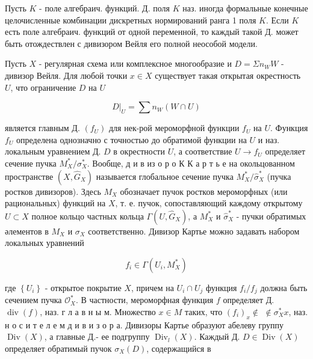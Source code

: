 \documentclass[10pt]{article}
\begin{document}
Пусть $K$ - поле алгебраич. функций. Д. поля $K$ наз. иногда формальные конечные целочисленные комбинации дискретных нормирований ранга 1 поля $K$. Если $K$ есть поле алгебраич. функций от одной переменной, то каждый такой Д. может быть отождествлен с дивизором Вейля его полной неособой модели.



Пусть $X$ - регулярная схема или комплексное многообразие и $D=\Sigma n_{W} W$ - дивизор Вейля. Для любой точки $x \in X$ существует такая открытая окрестность $U$, что ограничение $D$ на $U$



\[

\left.D\right|_{U}=\sum n_{W}(W \cap U)

\]



является главным Д. $\left(f_{U}\right)$ для нек-рой мероморфной функции $f_{U}$ на $U$. Функция $f_{U}$ определена однозначно с точностью до обратимой функции на $U$ и наз. локальным уравнением Д. $D$ в окрестности $U$, а соответствие $U \rightarrow f_{U}$ определяет сечение пучка $M_{X}^{*} / \sigma_{X}^{*}$. Вообще, д и в из о р о К К а р т ь е на окольцованном пространстве $\left(X, \widehat{G}_{X}\right)$ называется глобальное сечение пучка $M_{X}^{*} / \widehat{\sigma}_{X}^{*}$ (пучка ростков дивизоров). Здесь $M_{X}$ обозначает пучок ростков мероморфных (или рациональных) функций на $X$, т. е. пучок, сопоставляющий каждому открытому $U \subset X$ полное кольцо частных кольца $\Gamma\left(U, \widehat{G}_{X}\right)$, а $M_{X}^{*}$ и $\widehat{\sigma}_{X}^{*}$ - пучки обратимых әлементов в $M_{X}$ и $\sigma_{X}$ соответственно. Дивизор Картье можно задавать набором локальных уравнений



\[

f_{i} \in \Gamma\left(U_{i}, M_{X}^{*}\right)

\]



где $\left\{U_{i}\right\}$ - открытое покрытие $X$, причем на $U_{i} \cap U_{j}$ функция $f_{i} / f_{j}$ должна быть сечением пучка $\mathcal{O}_{X}^{*}$. В частности, мероморфная функция $f$ определяет Д. $\operatorname{div}(f)$, наз. г л а в н ы м. Множество $x \in M$ таких, что $\left(f_{i}\right)_{x} \notin$ $\notin \sigma_{X}^{*} x$, наз. н о с и т е л е м д и в и з о р а. Дивизоры Картье образуют абелеву группу $\operatorname{Div}(X)$, а главные Д.- ее подгруппу $\operatorname{Div}_{l}(X)$. Каждый Д. $D \in \operatorname{Div}(X)$ определяет обратимый пучок $\sigma_{X}(D)$, содержащийся в
\end{document}

